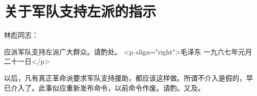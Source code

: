 \section[关于军队支持左派的指示（一九六七年一月二十一日）]{关于军队支持左派的指示}


林彪同志：

应派军队支持左派广大群众。请酌处。
<p align="right">毛泽东
一九六七年元月二十一日</p>

以后，凡有真正革命派要求军队支持援助，都应该这样做。所谓不介入是假的，早已介入了。此事似应重新发布命令，以前命令作废。请酌。又及。


